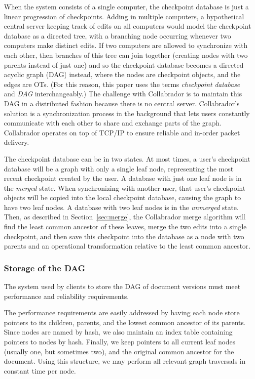 \documentclass[11pt,titlepage]{article}
\begin{document}
When the system consists of a single computer, the checkpoint database
is just a linear progression of checkpoints. Adding in multiple
computers, a hypothetical central server keeping track of edits on all
computers would model the checkpoint database as a directed tree, with
a branching node occurring whenever two computers make distinct
edits. If two computers are allowed to synchronize with each other,
then branches of this tree can join together (creating nodes with two
parents instead of just one) and so the checkpoint database becomes a
directed acyclic graph (DAG) instead, where the nodes are checkpoint objects,
and the edges are OTs.  (For this reason, this paper
uses the terms \emph{checkpoint database} and \emph{DAG}
interchangeably.)  The challenge with Collabrador is to maintain this
DAG in a distributed fashion because there is no central
server. Collabrador's solution is %
a synchronization process in the background that lets users
constantly communicate with each other to share and exchange parts of
the graph. Collabrador operates on top of TCP/IP to ensure reliable and
in-order packet delivery. 

The checkpoint database can be in two states. At most times, a user's 
checkpoint database will be a graph with only a single leaf node, 
representing the most recent checkpoint created by the user. 
A database with just one leaf node is in the \emph{merged}
state. When synchronizing with another user, that user's checkpoint
objects will be copied into the local checkpoint database, causing the
graph to have two leaf nodes. A database with two leaf nodes is in the
\emph{unmerged} state. Then, as described in
Section~\ref{sec:merge}, the Collabrador merge algorithm will find the
least common ancestor of these leaves, merge the two edits into a
single checkpoint, and then save this checkpoint into the database as
a node with two parents and an operational transformation relative to
the least common ancestor.

\subsubsection{Storage of the DAG}
\label{sec:storage-dag}

The system used by clients to store the DAG of document versions must
meet performance and reliability requirements.

The performance requirements are easily addressed by having each node
store pointers to its children, parents, and the lowest common
ancestor of its parents.  Since nodes are named by hash, we also
maintain an index table containing pointers to nodes by hash.
Finally, we keep pointers to all current leaf nodes (usually one, but
sometimes two), and the original common ancestor for the document.
Using this structure, we may perform all relevant graph traversals in
constant time per node.
\end{document}
